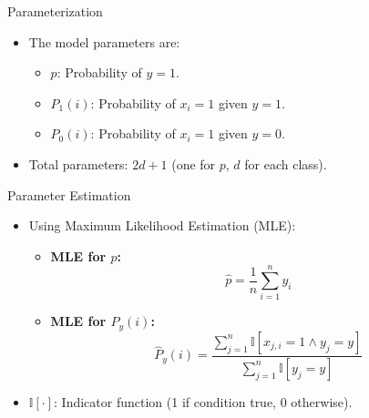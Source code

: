 
\begin{frame}{Parameterization}
    \begin{itemize}
        \item The model parameters are:
        \begin{itemize}
            \item $p$: Probability of $y=1$.
            \item $P_1(i)$: Probability of $x_i=1$ given $y=1$.
            \item $P_0(i)$: Probability of $x_i=1$ given $y=0$.
        \end{itemize}
        \item Total parameters: $2d + 1$ (one for $p$, $d$ for each class).
    \end{itemize}
\end{frame}

\begin{frame}{Parameter Estimation}
    \begin{itemize}
        \item Using Maximum Likelihood Estimation (MLE):
        \begin{itemize}
            \item \textbf{MLE for $p$:}
            \[
            \hat{p} = \frac{1}{n} \sum_{i=1}^n y_i
            \]
            \item \textbf{MLE for $P_y(i)$:}
            \[
            \hat{P}_y(i) = \frac{\sum_{j=1}^n \mathbb{I}[x_{j,i} = 1 \wedge y_j = y]}{\sum_{j=1}^n \mathbb{I}[y_j = y]}
            \]
        \end{itemize}
        \item $\mathbb{I}[\cdot]$: Indicator function (1 if condition true, 0 otherwise).
    \end{itemize}
\end{frame}

